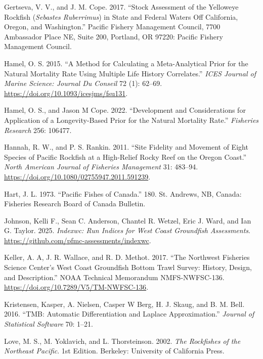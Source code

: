 \documentclass[
]{scrartcl}
\newlength{\cslhangindent}
\newenvironment{CSLReferences}[2] %
 {\begin{list}{}{%
  \setlength{\itemindent}{0pt}
  \setlength{\leftmargin}{0pt}
  \setlength{\parsep}{0pt}
  \ifodd #1
   \setlength{\leftmargin}{\cslhangindent}
   \setlength{\itemindent}{-1\cslhangindent}
  \fi
  \setlength{\itemsep}{#2\baselineskip}}}
 {\end{list}}
\begin{document}
\begin{CSLReferences}{1}{0}
Gertseva, V. V., and J. M. Cope. 2017. {``Stock Assessment of the
Yelloweye Rockfish (\emph{{Sebastes} Ruberrimus}) in State and {Federal}
Waters Off {California}, {Oregon}, and {Washington}.''} Pacific Fishery
Management Council, 7700 Ambassador Place NE, Suite 200, Portland, OR
97220: Pacific Fishery Management Council.

Hamel, O. S. 2015. {``A Method for Calculating a Meta-Analytical Prior
for the Natural Mortality Rate Using Multiple Life History
Correlates.''} \emph{ICES Journal of Marine Science: Journal Du Conseil}
72 (1): 62--69. \url{https://doi.org/10.1093/icesjms/fsu131}.

Hamel, O. S., and Jason M Cope. 2022. {``Development and Considerations
for Application of a Longevity-Based Prior for the Natural Mortality
Rate.''} \emph{Fisheries Research} 256: 106477.

Hannah, R. W., and P. S. Rankin. 2011. {``Site Fidelity and Movement of
Eight Species of Pacific Rockfish at a High-Relief Rocky Reef on the
Oregon Coast.''} \emph{North American Journal of Fisheries Management}
31: 483--94. \url{https://doi.org/10.1080/02755947.2011.591239}.

Hart, J. L. 1973. {``Pacific Fishes of Canada.''} 180. St. Andrews, NB,
Canada: Fisheries Research Board of Canada Bulletin.

Johnson, Kelli F., Sean C. Anderson, Chantel R. Wetzel, Eric J. Ward,
and Ian G. Taylor. 2025. \emph{Indexwc: Run Indices for West Coast
Groundfish Assessments}.
\url{https://github.com/pfmc-assessments/indexwc}.

Keller, A. A, J. R. Wallace, and R. D. Methot. 2017. {``The Northwest
Fisheries Science Center's West Coast Groundfish Bottom Trawl Survey:
History, Design, and Description.''} NOAA Technical Memorandum
NMFS-NWFSC-136. \url{https://doi.org/10.7289/V5/TM-NWFSC-136}.

Kristensen, Kasper, A. Nielsen, Casper W Berg, H. J. Skaug, and B. M.
Bell. 2016. {``{TMB}: {Automatic} {Differentiation} and {Laplace}
{Approximation}.''} \emph{Journal of Statistical Software} 70: 1--21.

Love, M. S., M. Yoklavich, and L. Thorsteinson. 2002. \emph{The
{Rockfishes} of the {Northeast} {Pacific}}. 1st Edition. Berkeley:
University of California Press.


\end{CSLReferences}
\end{document}
